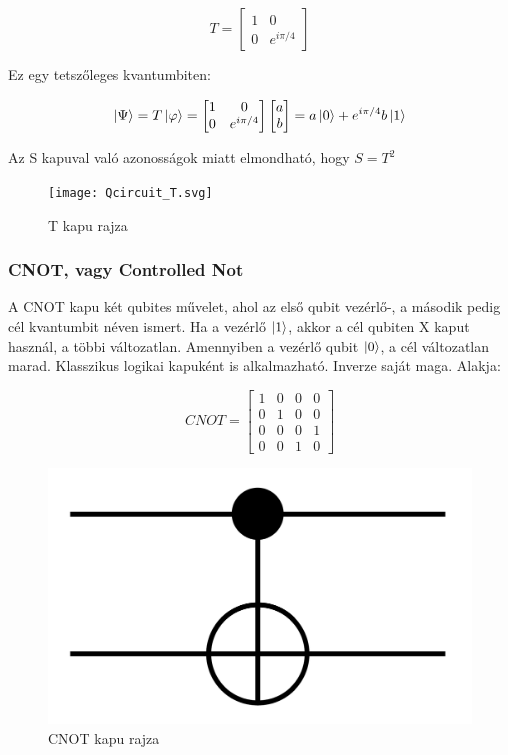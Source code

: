 \documentclass[
]{thesis-ekf}
\theoremstyle{definition}
\theoremstyle{remark}
\begin{document}
\begin{equation}
	T= 
	\begin{bmatrix}
		1 & 0\\
		0 & e^{i\pi/4}
	\end{bmatrix}
\end{equation}

Ez egy tetszőleges kvantumbiten:

\begin{equation}
	\ket{\Psi}=T\ket{\varphi}=
	\begin{bmatrix}
		1 & 0\\
		0 & e^{i\pi/4}
	\end{bmatrix}
	\begin{bmatrix}
		a\\
		b
	\end{bmatrix}=a\ket{0}+e^{i\pi/4}b\ket{1}
\end{equation}

Az S kapuval való azonosságok miatt elmondható, hogy $S=T^{2}$

\begin{figure}[H]
	\centering
	\texttt{[image: Qcircuit\_T.svg]}
	\caption{T kapu rajza}
	\label{fig:qcircuitt}
\end{figure}


\subsubsection{CNOT, vagy Controlled Not}
A CNOT kapu két qubites művelet, ahol az első qubit vezérlő-, a második pedig cél kvantumbit néven ismert. Ha a vezérlő $\ket{1}$, akkor a cél qubiten X kaput használ, a többi változatlan. Amennyiben a vezérlő qubit $\ket{0}$, a cél változatlan marad. Klasszikus logikai kapuként is alkalmazható. Inverze saját maga. Alakja:

\begin{equation}
	CNOT= 
	\begin{bmatrix}
		1 & 0 & 0 & 0\\
		0 & 1 & 0 & 0\\
		0 & 0 & 0 & 1\\
		0 & 0 & 1 & 0
	\end{bmatrix}
\end{equation}

\begin{figure}[H]
	\centering
	\includegraphics[width=0.25\linewidth]{CNOT}
	\caption{CNOT kapu rajza}
	\label{fig:cnot}
\end{figure}
\end{document}
